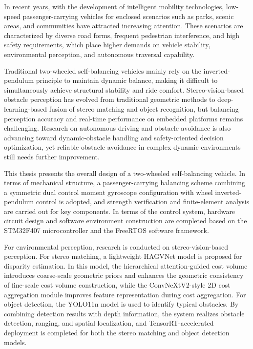 \begin{eabstract}
In recent years, with the development of intelligent mobility technologies, low-speed passenger-carrying vehicles for enclosed scenarios such as parks, scenic areas, and communities have attracted increasing attention. These scenarios are characterized by diverse road forms, frequent pedestrian interference, and high safety requirements, which place higher demands on vehicle stability, environmental perception, and autonomous traversal capability.

Traditional two-wheeled self-balancing vehicles mainly rely on the inverted-pendulum principle to maintain dynamic balance, making it difficult to simultaneously achieve structural stability and ride comfort. Stereo-vision-based obstacle perception has evolved from traditional geometric methods to deep-learning-based fusion of stereo matching and object recognition, but balancing perception accuracy and real-time performance on embedded platforms remains challenging. Research on autonomous driving and obstacle avoidance is also advancing toward dynamic-obstacle handling and safety-oriented decision optimization, yet reliable obstacle avoidance in complex dynamic environments still needs further improvement.

This thesis presents the overall design of a two-wheeled self-balancing vehicle. In terms of mechanical structure, a passenger-carrying balancing scheme combining a symmetric dual control moment gyroscope configuration with wheel inverted-pendulum control is adopted, and strength verification and finite-element analysis are carried out for key components. In terms of the control system, hardware circuit design and software environment construction are completed based on the STM32F407 microcontroller and the FreeRTOS software framework.

For environmental perception, research is conducted on stereo-vision-based perception. For stereo matching, a lightweight HAGVNet model is proposed for disparity estimation. In this model, the hierarchical attention-guided cost volume introduces coarse-scale geometric priors and enhances the geometric consistency of fine-scale cost volume construction, while the ConvNeXtV2-style 2D cost aggregation module improves feature representation during cost aggregation. For object detection, the YOLO11n model is used to identify typical obstacles. By combining detection results with depth information, the system realizes obstacle detection, ranging, and spatial localization, and TensorRT-accelerated deployment is completed for both the stereo matching and object detection models.


\end{eabstract}
